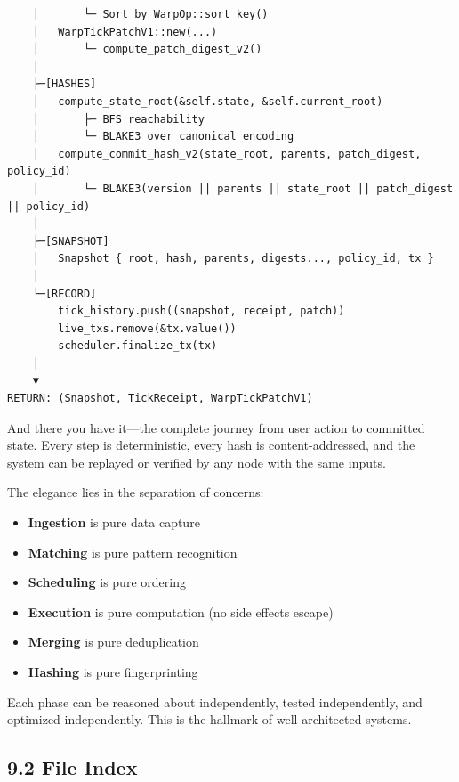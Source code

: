 \documentclass[11pt]{book}
\begin{document}
\begin{verbatim}
    │       └─ Sort by WarpOp::sort_key()
    │   WarpTickPatchV1::new(...)
    │       └─ compute_patch_digest_v2()
    │
    ├─[HASHES]
    │   compute_state_root(&self.state, &self.current_root)
    │       ├─ BFS reachability
    │       └─ BLAKE3 over canonical encoding
    │   compute_commit_hash_v2(state_root, parents, patch_digest, policy_id)
    │       └─ BLAKE3(version || parents || state_root || patch_digest || policy_id)
    │
    ├─[SNAPSHOT]
    │   Snapshot { root, hash, parents, digests..., policy_id, tx }
    │
    └─[RECORD]
        tick_history.push((snapshot, receipt, patch))
        live_txs.remove(&tx.value())
        scheduler.finalize_tx(tx)
    │
    ▼
RETURN: (Snapshot, TickReceipt, WarpTickPatchV1)
\end{verbatim}

\begin{tourguide}
And there you have it---the complete journey from user action to committed state. Every step is deterministic, every hash is content-addressed, and the system can be replayed or verified by any node with the same inputs.

The elegance lies in the separation of concerns:
\begin{itemize}
\item \textbf{Ingestion} is pure data capture
\item \textbf{Matching} is pure pattern recognition
\item \textbf{Scheduling} is pure ordering
\item \textbf{Execution} is pure computation (no side effects escape)
\item \textbf{Merging} is pure deduplication
\item \textbf{Hashing} is pure fingerprinting
\end{itemize}

Each phase can be reasoned about independently, tested independently, and optimized independently. This is the hallmark of well-architected systems.
\end{tourguide}

\subsection{9.2 File Index}\label{file-index}
\end{document}
